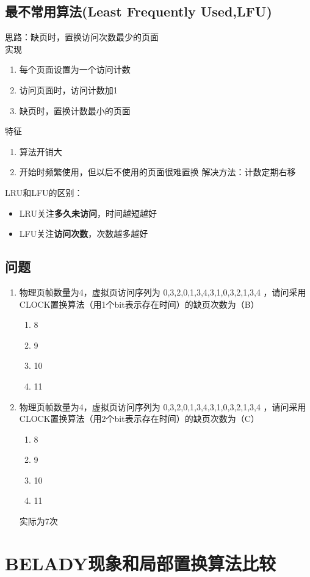 \subsection{最不常用算法(Least Frequently Used,LFU)}
思路：缺页时，置换访问次数最少的页面\\
实现
\begin{enumerate}
	\item 每个页面设置为一个访问计数
	\item 访问页面时，访问计数加1
	\item 缺页时，置换计数最小的页面
\end{enumerate}
特征
\begin{enumerate}
	\item 算法开销大
	\item 开始时频繁使用，但以后不使用的页面很难置换
	\subitem 解决方法：计数定期右移
\end{enumerate}
LRU和LFU的区别：
\begin{itemize}
	\item LRU关注\textbf{多久未访问}，时间越短越好
	\item LFU关注\textbf{访问次数}，次数越多越好
\end{itemize}
\subsection{问题}
\begin{enumerate}
\item 物理页帧数量为4，虚拟页访问序列为 0,3,2,0,1,3,4,3,1,0,3,2,1,3,4 ，请问采用CLOCK置换算法（用1个bit表示存在时间）的缺页次数为（B）
\begin{enumerate}
	\item 8
	\item 9
	\item 10
	\item 11
\end{enumerate}

\item 物理页帧数量为4，虚拟页访问序列为 0,3,2,0,1,3,4,3,1,0,3,2,1,3,4 ，请问采用CLOCK置换算法（用2个bit表示存在时间）的缺页次数为（C）
\begin{enumerate}
	\item 8
	\item 9
	\item 10
	\item 11
\end{enumerate}
实际为7次
\end{enumerate}

\section{BELADY现象和局部置换算法比较}
